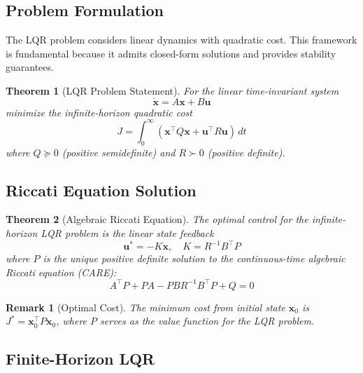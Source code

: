 \documentclass[a4paper, 11pt]{article}
\newtheorem{theorem}{Theorem}[section]
\newtheorem{remark}{Remark}[section]
\begin{document}
\subsection{Problem Formulation}

The LQR problem considers linear dynamics with quadratic cost. This framework is
fundamental because it admits closed-form solutions and provides stability guarantees.

\begin{theorem}[LQR Problem Statement]
For the linear time-invariant system
\begin{equation}
\dot{\mathbf{x}} = A\mathbf{x} + B\mathbf{u}
\end{equation}
minimize the infinite-horizon quadratic cost
\begin{equation}
J = \int_0^\infty (\mathbf{x}^\top Q \mathbf{x} + \mathbf{u}^\top R \mathbf{u}) \, dt
\end{equation}
where $Q \succeq 0$ (positive semidefinite) and $R \succ 0$ (positive definite).
\end{theorem}

\subsection{Riccati Equation Solution}

\begin{theorem}[Algebraic Riccati Equation]
The optimal control for the infinite-horizon LQR problem is the linear state feedback
\begin{equation}
\mathbf{u}^* = -K\mathbf{x}, \quad K = R^{-1}B^\top P
\end{equation}
where $P$ is the unique positive definite solution to the continuous-time algebraic
Riccati equation (CARE):
\begin{equation}
A^\top P + PA - PBR^{-1}B^\top P + Q = 0
\end{equation}
\end{theorem}

\begin{remark}[Optimal Cost]
The minimum cost from initial state $\mathbf{x}_0$ is $J^* = \mathbf{x}_0^\top P \mathbf{x}_0$,
where $P$ serves as the value function for the LQR problem.
\end{remark}

\subsection{Finite-Horizon LQR}
\end{document}
